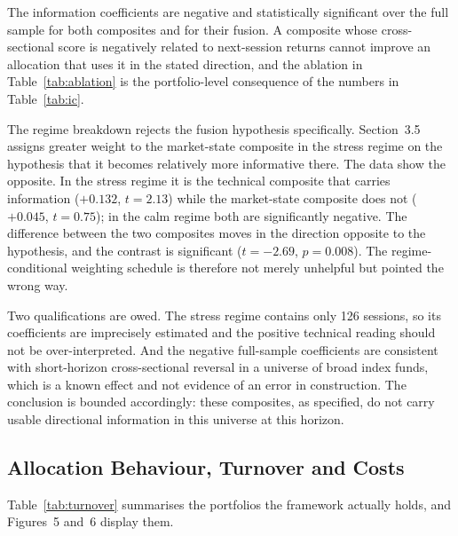 The information coefficients are negative and statistically significant over the full
sample for both composites and for their fusion. A composite whose cross-sectional
score is negatively related to next-session returns cannot improve an allocation that
uses it in the stated direction, and the ablation in Table~\ref{tab:ablation} is the portfolio-level
consequence of the numbers in Table~\ref{tab:ic}.

The regime breakdown rejects the fusion hypothesis specifically. Section~3.5 assigns
greater weight to the market-state composite in the stress regime on the hypothesis
that it becomes relatively more informative there. The data show the opposite. In the
stress regime it is the technical composite that carries information ($+0.132$,
$t = 2.13$) while the market-state composite does not ($+0.045$, $t = 0.75$); in the
calm regime both are significantly negative. The difference between the two composites
moves in the direction opposite to the hypothesis, and the contrast is significant
($t = -2.69$, $p = 0.008$). The regime-conditional weighting schedule is therefore not
merely unhelpful but pointed the wrong way.

Two qualifications are owed. The stress regime contains only 126 sessions, so its
coefficients are imprecisely estimated and the positive technical reading should not be
over-interpreted. And the negative full-sample coefficients are consistent with
short-horizon cross-sectional reversal in a universe of broad index funds, which is a
known effect and not evidence of an error in construction. The conclusion is bounded
accordingly: these composites, as specified, do not carry usable directional
information in this universe at this horizon.

\subsection{Allocation Behaviour, Turnover and Costs}
\label{sec:alloc}
\label{sec:cost}

Table~\ref{tab:turnover} summarises the portfolios the framework actually holds, and Figures~5 and~6
display them.

